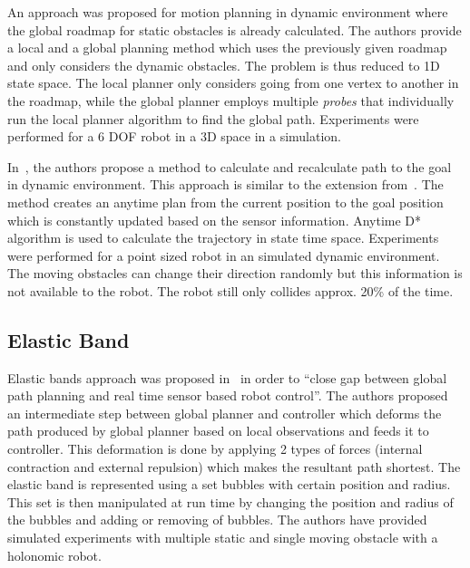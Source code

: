 An approach\cite{van2005roadmap} was proposed for motion planning in dynamic environment where the global roadmap for static obstacles is already calculated. The authors provide a local and a global planning method which uses the previously given roadmap and only considers the dynamic obstacles. The problem is thus reduced to 1D state space. The local planner only considers going from one vertex to another in the roadmap, while the global planner employs multiple \textit{probes} that individually run the local planner algorithm to find the global path. Experiments were performed for a 6 DOF robot in a 3D space in a simulation.

In~\cite{van2006anytime}, the authors propose a method to calculate and recalculate path to the goal in dynamic environment. This approach is similar to the extension from~\cite{hsu2002randomized}. The method creates an anytime plan from the current position to the goal position which is constantly updated based on the sensor information. Anytime D* algorithm is used to calculate the trajectory in state time space. Experiments were performed for a point sized robot in an simulated dynamic environment. The moving obstacles can change their direction randomly but this information is not available to the robot. The robot still only collides approx. 20\% of the time.

\subsection{Elastic Band}%
\label{sub:elastic_band}
Elastic bands approach was proposed in~\cite{quinlan1993elastic} in order to ``close 
gap between global path planning and real time sensor based robot control''\cite{quinlan1993elastic}.
The authors proposed an intermediate step between global planner and controller which deforms the
path produced by global planner based on local observations and feeds it to controller. This 
deformation is done by applying 2 types of forces (internal contraction and external repulsion)
which makes the resultant path shortest. The elastic band is represented using a set bubbles with 
certain position and radius. This set is then manipulated at run time by changing the position
and radius of the bubbles and adding or removing of bubbles. The authors have provided simulated 
experiments with multiple static and single moving obstacle with a holonomic robot.

